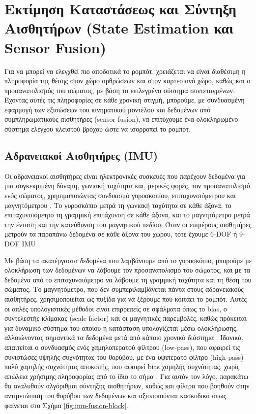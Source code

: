 \documentclass[11pt]{report}
\begin{document}
\section{Εκτίμηση Καταστάσεως και Σύντηξη Αισθητήρων (State Estimation και Sensor Fusion)}
Για να μπορεί να ελεγχθεί πιο αποδοτικά το ρομπότ, χρειάζεται να είναι
διαθέσιμη η πληροφορία της θέσης στον χώρο αρθρώσεων και στον καρτεσιανό
χώρο, καθώς και ο προσανατολισμός του σώματος, με βάση το επιλεγμένο σύστημα
συντεταγμένων. Έχοντας αυτές τις πληροφορίες σε κάθε χρονική στιγμή,
μπορούμε, με συνδυασμένη εφαρμογή των εξισώσεων του κινηματικού μοντέλου και
δεδομένων από συμπληρωματικούς αισθητήρες (sensor fusion), να επιτύχουμε ένα
ολοκληρωμένο σύστημα ελέγχου κλειστού βρόχου ώστε να ισορροπεί το ρομπότ.

\subsection{Αδρανειακοί Αισθητήρες (IMU)}
Οι αδρανειακοί αισθητήρες είναι ηλεκτρονικές συσκευές που παρέχουν δεδομένα
για μια συγκεκριμένη δύναμη, γωνιακή ταχύτητα και, μερικές φορές, τον
προσανατολισμό ενός σώματος, χρησιμοποιώντας συνδυασμό γυροσκοπίου,
επιταχυνσιόμετρου και μαγνητόμετρου \cite{kivikangas_estimating_2022}. Το
γυροσκόπιο μετρά τη γωνιακή ταχύτητα
σε κάθε άξονα, το επιταχυνσιόμετρο τη γραμμική επιτάχυνση σε κάθε άξονα, και
το μαγνητόμετρο μετρά την ένταση και την κατεύθυνση του μαγνητικού πεδίου.
Όταν οι επιμέρους αισθητήρες μετρούν τα παραπάνω δεδομένα σε κάθε άξονα του
χώρου, τότε έχουμε 6-DOF ή 9-DOF IMU \cite{mori_study_2022,prayogo_quadruped_2018}.

Με βάση τα ακατέργαστα δεδομένα που λαμβάνουμε από το γυροσκόπιο, μπορούμε με
ολοκλήρωση των δεδομένων να λάβουμε τον προσανατολισμό του σώματος, και με τα
δεδομένα από το επιταχυνσιόμετρο να λάβουμε τη γραμμική ταχύτητα και τη θέση
του σώματος. Το μαγνητόμετρο, που δεν συμπεριλαμβάνεται πάντα στους
αδρανειακούς αισθητήρες, χρησιμοποιείται ως πυξίδα για να ξέρουμε πού κοιτάει
το ρομπότ. Αυτές οι απλές υπολογιστικές μέθοδοι είναι επιρρεπείς σε
σφάλματα όπως το bias, ο συντελεστής κλίμακας (scale factor) και οι
μαγνητικές παρεμβολές, καθώς πρόκειται για δυναμικό σύστημα του οποίου η
κατάσταση υπολογίζεται μέσω ολοκλήρωσης, αλλοιώνοντας σημαντικά τα δεδομένα
μετά από κάποιο χρονικό διάστημα \cite{kivikangas_estimating_2022}. Ιδανικά,
απαιτείται ο συνδυασμός ενός χαμηλοπερατού φίλτρου (low-pass), που
αφαιρεί τις συνιστώσες υψηλής συχνότητας του θορύβου, με ένα υψιπερατό
φίλτρο (high-pass) πολύ χαμηλής συχνότητας αποκοπής, που αφαιρεί
bias χαμηλής συχνότητας, χωρίς απώλεια χρήσιμης πληροφορίας
από το ίδιο το σήμα \cite{cocoli_comparative_2023}. Για αυτόν τον λόγο,
παρακάτω θα αναλυθούν αλγόριθμοι σύντηξης αισθητήρων, καθώς και φίλτρα που
βοηθούν στην αντιμετώπιση του θορύβου των δεδομένων και αξιοποιούνται
κασκοδικά όπως φαίνεται στο Σχήμα \ref{fig:imu-fusion-block}.
\end{document}
